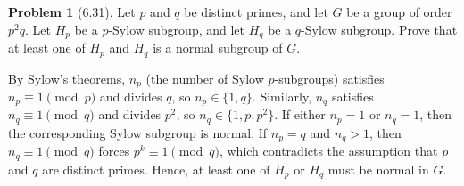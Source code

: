 \documentclass[12pt]{article}
\theoremstyle{definition}
\newtheorem{problem}{Problem}
\begin{document}
\begin{problem}[6.31]
    Let $p$ and $q$ be distinct primes, and let $G$ be a group of order $p^2q$. Let $H_p$ be a $p$-Sylow
    subgroup, and let $H_q$ be a $q$-Sylow subgroup. Prove that at least one of $H_p$ and $H_q$ is a normal
    subgroup of $G$.

    \begin{solution}
        By Sylow’s theorems, $n_p$ (the number of Sylow $p$-subgroups) satisfies $n_p \equiv 1 \pmod{p}$ and divides $q$, so $n_p \in \{1,q\}$. Similarly, $n_q$ satisfies $n_q \equiv 1 \pmod{q}$ and divides $p^2$, so $n_q \in \{1,p,p^2\}$. If either $n_p = 1$ or $n_q = 1$, then the corresponding Sylow subgroup is normal. If $n_p = q$ and $n_q > 1$, then $n_q \equiv 1 \pmod{q}$ forces $p^k \equiv 1 \pmod{q}$, which contradicts the assumption that $p$ and $q$ are distinct primes. Hence, at least one of $H_p$ or $H_q$ must be normal in $G$.
    \end{solution}
\end{problem}
\end{document}
